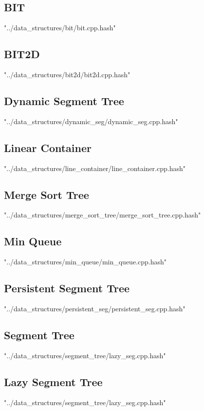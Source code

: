 \documentclass [12pt,onecolumn,oneside]{article}
\begin{document}
\subsection{ BIT}
 {"../data_structures/bit/bit.cpp.hash"}
\newpage

\subsection{ BIT2D}
 {"../data_structures/bit2d/bit2d.cpp.hash"}
\newpage

\subsection{ Dynamic Segment Tree}
 {"../data_structures/dynamic_seg/dynamic_seg.cpp.hash"}
\newpage

\subsection{ Linear Container}
 {"../data_structures/line_container/line_container.cpp.hash"}
\newpage

\subsection{ Merge Sort Tree}
 {"../data_structures/merge_sort_tree/merge_sort_tree.cpp.hash"}
\newpage

\subsection{ Min Queue}
 {"../data_structures/min_queue/min_queue.cpp.hash"}
\newpage

\subsection{ Persistent Segment Tree}
 {"../data_structures/persistent_seg/persistent_seg.cpp.hash"}
\newpage

\subsection{ Segment Tree}
 {"../data_structures/segment_tree/lazy_seg.cpp.hash"}
\newpage

\subsection{ Lazy Segment Tree}
 {"../data_structures/segment_tree/lazy_seg.cpp.hash"}
\newpage
\end{document}
